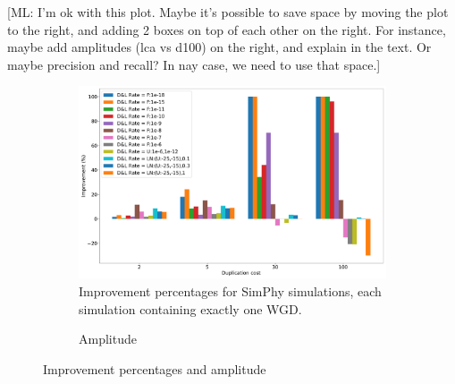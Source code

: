 \documentclass[10pt]{article}
\newcommand{\ml}[1]{\begingroup\color{blue}#1\endgroup}
\begin{document}
\ml{[ML: I'm ok with this plot.  Maybe it's possible to save space by moving the plot to the right, and adding 2 boxes on top of each other on the right.  For instance, maybe add amplitudes (lca vs d100) on the right, and explain in the text.  Or maybe precision and recall?  In nay case, we need to use that space.]}


\begin{figure}[hbt!]
    \centering
    \begin{subfigure}[t]{0.58\textwidth}
        \centering
        \includegraphics[width=\textwidth]{figs_shortversion/imp_1WGD.pdf} %
        \caption{Improvement percentages for SimPhy simulations, each simulation containing exactly one WGD.}
        \label{fig:imp}
    \end{subfigure}
    \hfill
    \begin{subfigure}[t]{0.41\textwidth}
        \centering
        \caption{Amplitude}
        \label{fig:amp}
    \end{subfigure}

    \caption{Improvement percentages and amplitude}
    \label{fig:imp_amp}
\end{figure}
\end{document}
